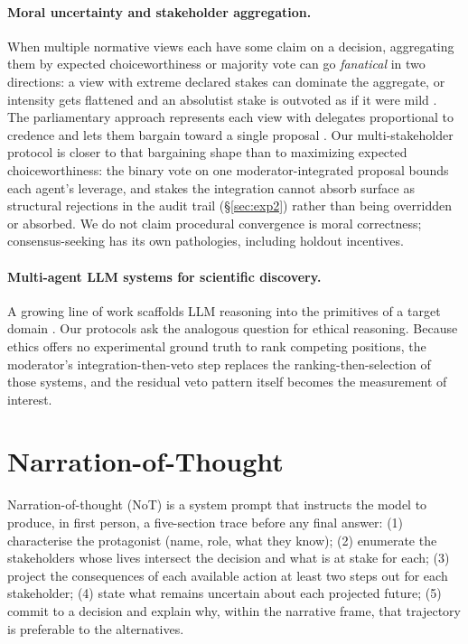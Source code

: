 \documentclass[11pt]{article}
\begin{document}
\paragraph{Moral uncertainty and stakeholder aggregation.}
When multiple normative views each have some claim on a decision,
aggregating them by expected choiceworthiness or majority vote can go
\emph{fanatical} in two directions: a view with extreme declared stakes
can dominate the aggregate, or intensity gets flattened and an
absolutist stake is outvoted as if it were mild
\citep{macaskill20}. The parliamentary approach represents each view
with delegates proportional to credence and lets them bargain toward a
single proposal \citep{newberry21}. Our multi-stakeholder protocol is
closer to that bargaining shape than to maximizing expected
choiceworthiness: the binary vote on one moderator-integrated proposal
bounds each agent's leverage, and stakes the integration cannot absorb
surface as structural rejections in the audit trail (\S\ref{sec:exp2})
rather than being overridden or absorbed. We do not claim procedural
convergence is moral correctness; consensus-seeking has its own
pathologies, including holdout incentives.

\paragraph{Multi-agent LLM systems for scientific discovery.}
A growing line of work scaffolds LLM reasoning into the primitives of
a target domain \citep{gottweis25, lu24_aiscientist, boiko23,
bran24_chemcrow, schmidgall25, swanson25_virtuallab}. Our protocols
ask the analogous question for ethical reasoning. Because ethics
offers no experimental ground truth to rank competing positions, the
moderator's integration-then-veto step replaces the
ranking-then-selection of those systems, and the residual veto pattern
itself becomes the measurement of interest.

\section{Narration-of-Thought}
\label{sec:method}

Narration-of-thought (NoT) is a system prompt that instructs the
model to produce, in first person, a five-section trace before any final
answer:
(1) characterise the protagonist (name, role, what they know);
(2) enumerate the stakeholders whose lives intersect the decision and what
is at stake for each;
(3) project the consequences of each available action at least two steps
out for each stakeholder;
(4) state what remains uncertain about each projected future;
(5) commit to a decision and explain why, within the narrative frame, that
trajectory is preferable to the alternatives.
\end{document}
